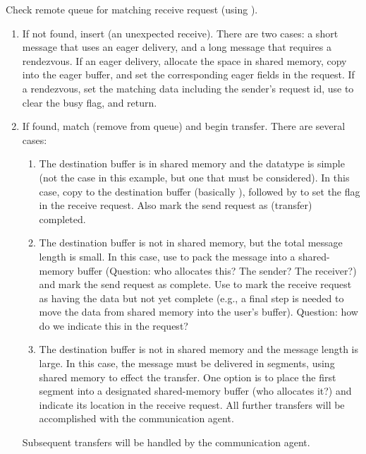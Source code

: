 Check remote queue for matching receive request (using
).  
\begin{enumerate}
\item If not found, insert (an unexpected receive).  There are two cases: a
  short message that uses an eager delivery, and a long message that requires
  a rendezvous.  If an eager delivery, allocate the space in shared memory,
  copy into the eager buffer, and set the corresponding eager fields in the
  request.  If a rendezvous, set the matching data
  including the sender's 
  request id, use  to clear the busy flag, and
  return.  
\item If found, match (remove from queue) and begin transfer.  There are
  several cases:
    \begin{enumerate}
    \item The destination buffer is in shared memory and the datatype is
      simple (not the case in this example, but one that must be considered). 
      In this case, copy to the destination buffer (basically
      ), followed by  to
      set 
      the  flag in the receive request.  Also mark the
      send request as (transfer) completed.
    \item The destination buffer is not in shared memory, but the total
      message length is small.  In this case, use  to pack
      the message into a shared-memory buffer (Question: who allocates this?
      The sender?  The receiver?) and mark the send request as complete.
      Use  to mark the receive request as
      having 
      the data but not yet complete (e.g., a final step is needed to move the
      data from shared memory into the user's buffer).  Question: how do we
      indicate this in the request?
    \item The destination buffer is not in shared memory and the message
      length is large.  In this case, the message must be delivered in
      segments, using shared memory to effect the transfer.  One option is to
      place the first segment into a designated shared-memory buffer (who
      allocates it?) and indicate its location in the receive request.  All
      further transfers will be accomplished with the communication agent.
    \end{enumerate}
    Subsequent transfers will be handled by the communication agent.
\end{enumerate}

